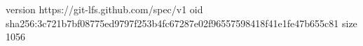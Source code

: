 version https://git-lfs.github.com/spec/v1
oid sha256:3c721b7bf08775ed9797f253b4fc67287e02f96557598418f41e1fe47b655c81
size 1056
